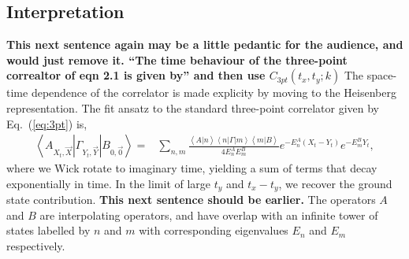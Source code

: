 \documentclass{PoS}
\newcommand{\dgr}[1]{\textcolor{David}{#1}}
\begin{document}
\subsection{Interpretation}
\dgr{\bfseries This next sentence again may be a little pedantic for the audience, and would just remove it.  ``The time behaviour of the three-point correaltor of eqn 2.1 is given by'' and then use $C_{3pt}(t_x, t_y; k)$}
The space-time dependence of the correlator is made explicity by
moving to the Heisenberg representation. The fit ansatz to the
standard three-point correlator given by Eq.~(\ref{eq:3pt}) is,
\begin{align}
\left<A_{X_t,\vec{X}}|\Gamma_{Y_t,\vec{Y}}|B_{0,\vec{0}}\right> = & \sum_{n,m} \frac{\left<A | n\right>\left<n| \Gamma |m\right>\left<m | B\right>}{4E^A_n E^B_m} e^{-E^A_n(X_t - Y_t)} e^{-E^B_m Y_t} \label{eq:3ptfit},
\end{align}
where we Wick rotate to imaginary time, yielding a sum of \dgr{terms}
that decay exponentially in time.
\dgr{ In the limit of large $t_y$ and $t_x - t_y$,}
we recover the ground state contribution. \dgr{\bfseries This next sentence should be earlier.} The operators $A$ and $B$ are
interpolating operators, and have overlap with an infinite tower of
states labelled by $n$ and $m$ with corresponding eigenvalues $E_n$
and $E_m$ respectively.
\end{document}
